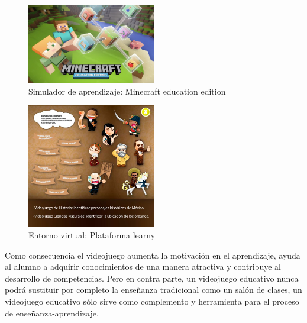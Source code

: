 	\begin{figure}
		\centering
	\caption{Simulador de aprendizaje: Minecraft education edition}
		\label{fig:mine}
		\includegraphics[width=0.5\textwidth]{03MarcoTeorico/imageR/minecraft.jpg}
\end{figure}
	\begin{figure}
	\centering
		\caption{Entorno virtual: Plataforma learny}
		\label{fig:lea}
		\includegraphics[width=0.5\textwidth]{03MarcoTeorico/imageR/learny.jpg}
\end{figure}

Como consecuencia el videojuego aumenta la motivación en el aprendizaje, ayuda al alumno a adquirir conocimientos de una manera atractiva y contribuye al desarrollo de competencias. Pero en contra parte, un videojuego educativo nunca podrá sustituir por completo la enseñanza tradicional como un salón de clases, un videojuego educativo sólo sirve como complemento y herramienta para el proceso de enseñanza-aprendizaje.
\\[1pt]
